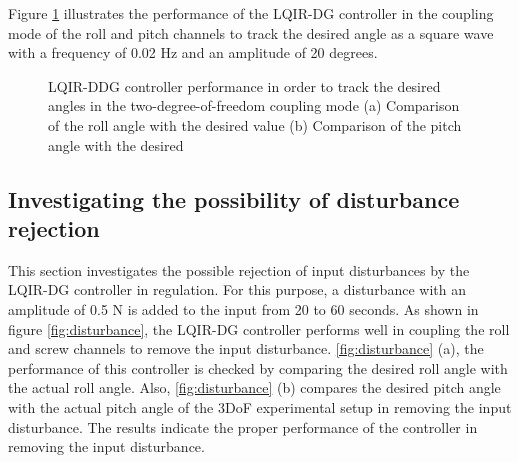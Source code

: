 \documentclass[3p,times]{elsarticle}
\begin{document}
Figure \ref{fig:square} illustrates the performance of the LQIR-DG controller in the coupling mode of the roll and pitch channels to track the desired angle as a square wave with a frequency of 0.02 Hz and an amplitude of 20 degrees.


\begin{figure}[H]
	\centering
	\caption{LQIR-DDG controller performance in order to track the desired angles in the two-degree-of-freedom coupling mode (a) Comparison of the roll angle with the desired value (b) Comparison of the pitch angle with the desired}
	\label{fig:square}
\end{figure}

\subsection{Investigating the possibility of disturbance rejection}

\noindent This section investigates the possible rejection of input disturbances by the LQIR-DG controller in regulation. For this purpose, a disturbance with an amplitude of 0.5 N is added to the input from 20 to 60 seconds. As shown in figure \ref{fig:disturbance}, the LQIR-DG controller performs well in coupling the roll and screw channels to remove the input disturbance. \ref{fig:disturbance} (a), the performance of this controller is checked by comparing the desired roll angle with the actual roll angle. Also, \ref{fig:disturbance}  (b) compares the desired pitch angle with the actual pitch angle of the 3DoF experimental setup in removing the input disturbance. The results indicate the proper performance of the controller in removing the input disturbance.
\end{document}
